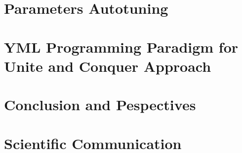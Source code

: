 \documentclass{xinzhewu}
\begin{document}


\chapter{Parameters Autotuning}  \label{Parameters Autotuning}



\chapter{YML Programming Paradigm for Unite and Conquer Approach} \label{YML and XMP Multi-level Parallelism Programming Paradigm}



\chapter{Conclusion and Pespectives} \label{Conclusion and Pespectives}



\chapter*{Scientific Communication}




\clearemptydoublepage
\end{document}
